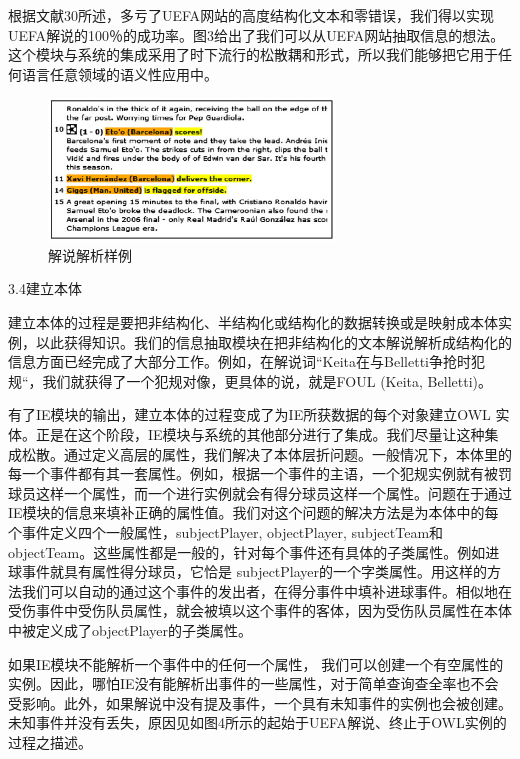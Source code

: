 根据文献30所述，多亏了{\Times UEFA}网站的高度结构化文本和零错误，我们得以实现{\Times UEFA}解说的100％的成功率。图3给出了我们可以从{\Times UEFA}网站抽取信息的想法。这个模块与系统的集成采用了时下流行的松散耦和形式，所以我们能够把它用于任何语言任意领域的语义性应用中。

	\begin{figure}[htbp] 
	\centering\includegraphics[width=3in]{fig/trans/fig3.png} 
	\caption[]{解说解析样例}
	\end{figure} 

3.4建立本体

建立本体的过程是要把非结构化、半结构化或结构化的数据转换或是映射成本体实例，以此获得知识。我们的信息抽取模块在把非结构化的文本解说解析成结构化的信息方面已经完成了大部分工作。例如，在解说词“{\Times Keita}在与{\Times Belletti}争抢时犯规“，我们就获得了一个犯规对像，更具体的说，就是{\Times FOUL (Keita, Belletti)}。

有了{\Times IE}模块的输出，建立本体的过程变成了为{\Times IE}所获数据的每个对象建立{\Times OWL} 实体。正是在这个阶段，{\Times IE}模块与系统的其他部分进行了集成。我们尽量让这种集成松散。通过定义高层的属性，我们解决了本体层折问题。一般情况下，本体里的每一个事件都有其一套属性。例如，根据一个事件的主语，一个犯规实例就有被罚球员这样一个属性，而一个进行实例就会有得分球员这样一个属性。问题在于通过{\Times IE}模块的信息来填补正确的属性值。我们对这个问题的解决方法是为本体中的每个事件定义四个一般属性，{\Times subjectPlayer}, {\Times objectPlayer}, {\Times subjectTeam}和 {\Times objectTeam}。这些属性都是一般的，针对每个事件还有具体的子类属性。例如进球事件就具有属性得分球员，它恰是 {\Times subjectPlayer}的一个字类属性。用这样的方法我们可以自动的通过这个事件的发出者，在得分事件中填补进球事件。相似地在受伤事件中受伤队员属性，就会被填以这个事件的客体，因为受伤队员属性在本体中被定义成了{\Times objectPlayer}的子类属性。

如果{\Times IE}模块不能解析一个事件中的任何一个属性， 我们可以创建一个有空属性的实例。因此，哪怕{\Times IE}没有能解析出事件的一些属性，对于简单查询查全率也不会受影响。此外，如果解说中没有提及事件，一个具有未知事件的实例也会被创建。未知事件并没有丢失，原因见如图4所示的起始于{\Times UEFA}解说、终止于{\Times OWL}实例的过程之描述。

